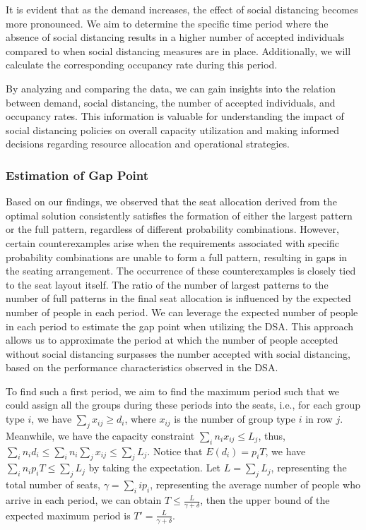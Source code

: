It is evident that as the demand increases, the effect of social distancing becomes more pronounced. We aim to determine the specific time period where the absence of social distancing results in a higher number of accepted individuals compared to when social distancing measures are in place. Additionally, we will calculate the corresponding occupancy rate during this period.

By analyzing and comparing the data, we can gain insights into the relation between demand, social distancing, the number of accepted individuals, and occupancy rates. This information is valuable for understanding the impact of social distancing policies on overall capacity utilization and making informed decisions regarding resource allocation and operational strategies.

\subsubsection{Estimation of Gap Point}
Based on our findings, we observed that the seat allocation derived from the optimal solution consistently satisfies the formation of either the largest pattern or the full pattern, regardless of different probability combinations. However, certain counterexamples arise when the requirements associated with specific probability combinations are unable to form a full pattern, resulting in gaps in the seating arrangement. The occurrence of these counterexamples is closely tied to the seat layout itself. The ratio of the number of largest patterns to the number of full patterns in the final seat allocation is influenced by the expected number of people in each period. We can leverage the expected number of people in each period to estimate the gap point when utilizing the DSA. This approach allows us to approximate the period at which the number of people accepted without social distancing surpasses the number accepted with social distancing, based on the performance characteristics observed in the DSA.

To find such a first period, we aim to find the maximum period such that we could assign all the groups during these periods into the seats, i.e., for each group type $i$, we have $\sum_{j} x_{ij} \geq d_i$, where $x_{ij}$ is the number of group type $i$ in row $j$. Meanwhile, we have the capacity constraint $\sum_{i} n_{i} x_{ij} \leq L_j$, thus, $\sum_{i} n_i d_i \leq \sum_{i} n_i \sum_{j} x_{ij} \leq \sum_{j} L_{j}$. Notice that $E(d_i) = p_i T$, we have $\sum_{i} n_i p_i T \leq \sum_{j} L_{j}$ by taking the expectation. Let $L = \sum_{j} L_{j}$, representing the total number of seats, $\gamma = \sum_{i} i p_i$, representing the average number of people who arrive in each period, we can obtain $T \leq \frac{L}{\gamma + \delta}$, then the upper bound of the expected maximum period is $T' = \frac{L}{\gamma + \delta}$.

